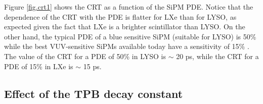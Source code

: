 \documentclass[review]{elsarticle}
\begin{document}
 Figure \ref{fig.crt1} shows the CRT as a function of the
 SiPM PDE. Notice that the dependence of the CRT with the PDE is flatter for LXe than for LYSO, as expected given the fact that LXe is a brighter scintillator than LYSO. On the other hand, the typical PDE of a blue sensitive SiPM (suitable for LYSO) is 50\% while the best VUV-sensitive SiPMs available today have a sensitivity of 15\% \cite{meg}. The value of the CRT for a PDE of 50\% in LYSO is $\sim$ 20 ps, while
the CRT for a PDE of 15\% in LXe is $\sim$ 15 ps.
  
\subsection*{Effect of the TPB decay constant}
%
%
\end{document}
